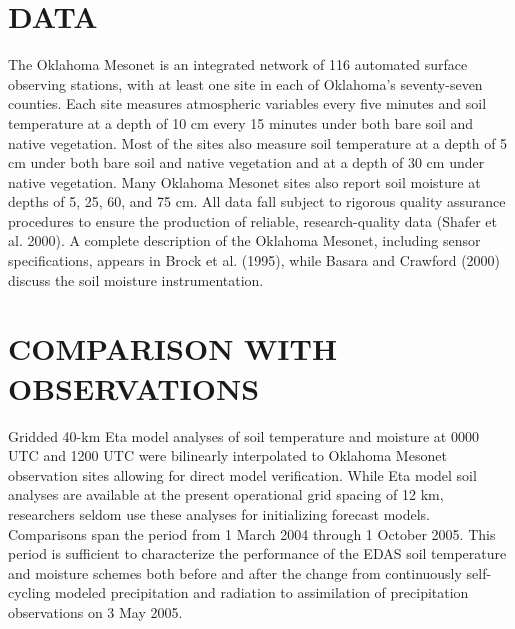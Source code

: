 \documentclass[twocolumn]{article}
\begin{document}
\section{{\normalsize \hspace{-0.195in} {\textbf{
DATA
}}}} \vspace{-1.6mm}
\label{etacomp_data.sec}
The Oklahoma Mesonet is an integrated network of 116 automated surface observing stations, with at least one site in each of Oklahoma's seventy-seven counties.  Each site measures atmospheric variables every five minutes and soil temperature at a depth of 10 cm every 15 minutes under both bare soil and native vegetation.  Most of the sites also measure soil temperature at a depth of 5 cm under both bare soil and native vegetation and at a depth of 30 cm under native vegetation.  Many Oklahoma Mesonet sites also report soil moisture at depths of 5, 25, 60, and 75 cm.  All data fall subject to rigorous quality assurance procedures to ensure the production of reliable, research-quality data (Shafer et al. 2000).  A complete description of the Oklahoma Mesonet, including sensor specifications, appears in Brock et al. (1995), while Basara and Crawford (2000) discuss the soil moisture instrumentation.

\section{{\normalsize \hspace{-0.195in} {\textbf{
COMPARISON WITH OBSERVATIONS
}}}} \vspace{-1.6mm}
\label{etacomp_comp.sec}
Gridded 40-km Eta model analyses of soil temperature and moisture at 0000 UTC and 1200 UTC were bilinearly interpolated to Oklahoma Mesonet observation sites allowing for direct model verification.  While Eta model soil analyses are available at the present operational grid spacing of 12 km, researchers seldom use these analyses for initializing forecast models.  Comparisons span the period from 1 March 2004 through 1 October 2005.  This period is sufficient to characterize the performance of the EDAS soil temperature and moisture schemes both before and after the change from continuously self-cycling modeled precipitation and radiation to assimilation of precipitation observations on 3 May 2005.
\end{document}
